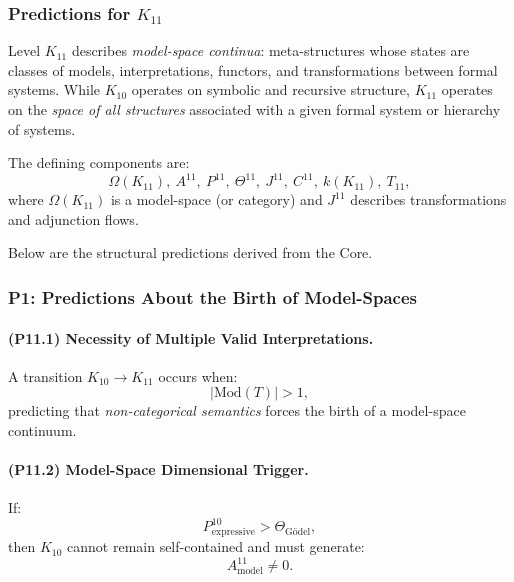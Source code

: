 

\subsubsection{Predictions for $K_{11}$}
\label{sec:predictions-k11}

Level $K_{11}$ describes \emph{model-space continua}: 
meta-structures whose states are classes of models,  
interpretations, functors, and transformations between 
formal systems.  
While $K_{10}$ operates on symbolic and recursive structure,  
$K_{11}$ operates on the \emph{space of all structures} 
associated with a given formal system or hierarchy of systems.

The defining components are:
\[
\Omega(K_{11}),\ 
A^{11},\ 
P^{11},\ 
\Theta^{11},\ 
J^{11},\ 
C^{11},\ 
k(K_{11}),\ 
T_{11},
\]
where $\Omega(K_{11})$ is a model-space (or category) and 
$J^{11}$ describes transformations and adjunction flows.

Below are the structural predictions derived from the Core.

\subsubsection{P1: Predictions About the Birth of Model-Spaces}

\paragraph{(P11.1) Necessity of Multiple Valid Interpretations.}
A transition $K_{10} \to K_{11}$ occurs when:
\[
|\mathrm{Mod}(T)| > 1,
\]
predicting that \emph{non-categorical semantics} forces 
the birth of a model-space continuum.

\paragraph{(P11.2) Model-Space Dimensional Trigger.}
If:
\[
P_{\mathrm{expressive}}^{10} > \Theta_{\mathrm{Gödel}},
\]
then $K_{10}$ cannot remain self-contained and must generate:
\[
A_{\mathrm{model}}^{11} \neq 0.
\]

